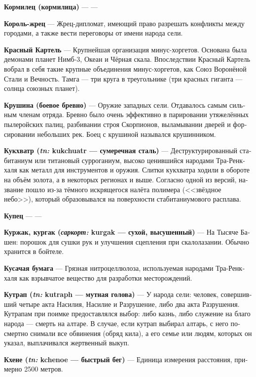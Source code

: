 \documentclass[a4paper,12pt,fleqn]{book}\usepackage{cooltooltips}\usepackage{polyglossia}\setdefaultlanguage[babelshorthands=true]{russian}\setotherlanguage{english}\defaultfontfeatures{Ligatures=TeX,Mapping=tex-text} \usepackage{xcolor}\definecolor{lightgray}{HTML}{bbbbbb}\color{lightgray}\newcommand{\ml}[3]{\textenglish{\textcolor{black}{#3}}}
\newcommand{\theterm}[3]{\textbf{\hypertarget{#1}{#2}} --- #3}
\newcommand{\theorigin}[3]{\textit{#1:} #2 --- #3}
\begin{document}
{\theterm{nurse}
{Кормилец (кормилица)}
{---}

\theterm{priest-king} %
{Король-жрец}
{Жрец-дипломат, имеющий право разрешать конфликты между городами, а также вести переговоры от имени народа сели.}

\theterm{scarlett-cartel} %
{Красный Картель}
{Крупнейшая организация минус-хоргетов.
Основана была демонами планет Нимб-3, Океан и Чёрная скала.
Впоследствии Красный Картель вобрал в себя такие крупные объединения минус-хоргетов, как Союз Воронёной Стали и Вечность.
Тамга --- три круга в треугольнике (три красных гиганта --- солнца союзных планет).}

\theterm{crushwood}
{Крушина (боевое бревно)} %
{Оружие западных сели.
Отдавалось самым сильным членам отряда.
Бревно было очень эффективно в парировании утяжелённых пылеройских палиц, разбивании строя Скорпионов, выламывании дверей и форсировании небольших рек.
Боец с крушиной назывался крушинником. %
}

\theterm{kukchuatr}
{Кукхватр (\theorigin{tn}{kukchuatr}{сумеречная сталь})}
{Деструктурированный стабитаниум или титановый сурроганиум, высоко ценившийся народами Тра-Ренкхаля как металл для инструментов и оружия.
Слитки кукхватра ходили в обороте на объём золота, а в некоторых регионах и выше.
Согласно одной из версий, название пошло из-за тёмного искрящегося налёта полимера (<<звёздное небо>>), который образовывался на поверхности стабитаниумового расплава.}

\theterm{trader} %
{Купец}
{---}

\theterm{kurschack}
{Куржак, кургак (\theorigin{саркорт}{kurgak}{сухой, высушенный})}
{На Тысяче Башен: порошок для сушки рук и улучшения сцепления при скалолазании.
Обычно хранится в бойтеле.}

\theterm{biting-paper} %
{Кусачая бумага}
{Грязная нитроцеллюлоза, используемая народами Тра-Ренкхаля как взрывчатое вещество для разработки месторождений.}

\theterm{kutraph}
{Кутрап (\theorigin{tn}{kutraph}{мутная голова})}
{У народа сели: человек, совершивший четыре акта Насилия, Насилие и Разрушение, либо два акта Разрушения.
Кутрапам при поимке предоставлялся выбор: либо казнь, либо служение на благо народа --- смерть на алтаре.
В случае, если кутрап выбирал алтарь, с него посмертно снимали все обвинения (обряд кила), а его семье или людям, которых он указал, выплачивался жертвенный выкуп.}

\theterm{kchenoe-distance}
{Кхене (\theorigin{tn}{kchenoe}{быстрый бег})}
{Единица измерения расстояния, примерно 2500 метров.}

}
\end{document}
